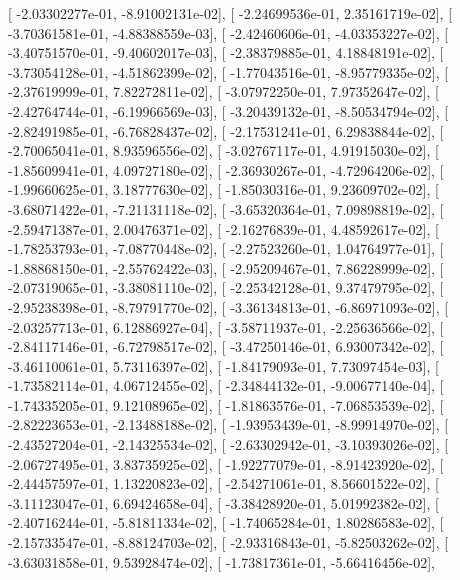 \documentclass{article}
\begin{document}
       [ -2.03302277e-01,  -8.91002131e-02],
       [ -2.24699536e-01,   2.35161719e-02],
       [ -3.70361581e-01,  -4.88388559e-03],
       [ -2.42460606e-01,  -4.03353227e-02],
       [ -3.40751570e-01,  -9.40602017e-03],
       [ -2.38379885e-01,   4.18848191e-02],
       [ -3.73054128e-01,  -4.51862399e-02],
       [ -1.77043516e-01,  -8.95779335e-02],
       [ -2.37619999e-01,   7.82272811e-02],
       [ -3.07972250e-01,   7.97352647e-02],
       [ -2.42764744e-01,  -6.19966569e-03],
       [ -3.20439132e-01,  -8.50534794e-02],
       [ -2.82491985e-01,  -6.76828437e-02],
       [ -2.17531241e-01,   6.29838844e-02],
       [ -2.70065041e-01,   8.93596556e-02],
       [ -3.02767117e-01,   4.91915030e-02],
       [ -1.85609941e-01,   4.09727180e-02],
       [ -2.36930267e-01,  -4.72964206e-02],
       [ -1.99660625e-01,   3.18777630e-02],
       [ -1.85030316e-01,   9.23609702e-02],
       [ -3.68071422e-01,  -7.21131118e-02],
       [ -3.65320364e-01,   7.09898819e-02],
       [ -2.59471387e-01,   2.00476371e-02],
       [ -2.16276839e-01,   4.48592617e-02],
       [ -1.78253793e-01,  -7.08770448e-02],
       [ -2.27523260e-01,   1.04764977e-01],
       [ -1.88868150e-01,  -2.55762422e-03],
       [ -2.95209467e-01,   7.86228999e-02],
       [ -2.07319065e-01,  -3.38081110e-02],
       [ -2.25342128e-01,   9.37479795e-02],
       [ -2.95238398e-01,  -8.79791770e-02],
       [ -3.36134813e-01,  -6.86971093e-02],
       [ -2.03257713e-01,   6.12886927e-04],
       [ -3.58711937e-01,  -2.25636566e-02],
       [ -2.84117146e-01,  -6.72798517e-02],
       [ -3.47250146e-01,   6.93007342e-02],
       [ -3.46110061e-01,   5.73116397e-02],
       [ -1.84179093e-01,   7.73097454e-03],
       [ -1.73582114e-01,   4.06712455e-02],
       [ -2.34844132e-01,  -9.00677140e-04],
       [ -1.74335205e-01,   9.12108965e-02],
       [ -1.81863576e-01,  -7.06853539e-02],
       [ -2.82223653e-01,  -2.13488188e-02],
       [ -1.93953439e-01,  -8.99914970e-02],
       [ -2.43527204e-01,  -2.14325534e-02],
       [ -2.63302942e-01,  -3.10393026e-02],
       [ -2.06727495e-01,   3.83735925e-02],
       [ -1.92277079e-01,  -8.91423920e-02],
       [ -2.44457597e-01,   1.13220823e-02],
       [ -2.54271061e-01,   8.56601522e-02],
       [ -3.11123047e-01,   6.69424658e-04],
       [ -3.38428920e-01,   5.01992382e-02],
       [ -2.40716244e-01,  -5.81811334e-02],
       [ -1.74065284e-01,   1.80286583e-02],
       [ -2.15733547e-01,  -8.88124703e-02],
       [ -2.93316843e-01,  -5.82503262e-02],
       [ -3.63031858e-01,   9.53928474e-02],
       [ -1.73817361e-01,  -5.66416456e-02],
\end{document}
